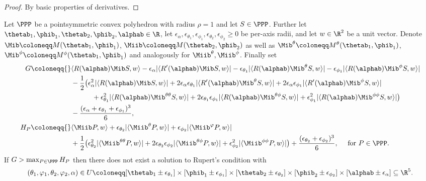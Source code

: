 \begin{proof}\leanok
By basic properties of derivatives.
\end{proof}

\begin{theorem} \label{thm:global}
\leanok
    Let $\PPP$ be a pointsymmetric convex polyhedron with radius $\rho =1$ and let $S \in \PPP$. Further let $\thetab_1,\phib_1,\thetab_2,\phib_2,\alphab \in \R$, let
    $\epsilon_\alpha, \epsilon_{\theta_1}, \epsilon_{\phi_1}, \epsilon_{\theta_2}, \epsilon_{\phi_2} \geq 0$
    be per-axis radii, and let $w\in\R^2$ be a unit vector. Denote $\Mib \coloneqq M(\thetab_1, \phib_1)$, $ \Miib \coloneqq M(\thetab_2, \phib_2)$ as well as $\Mib^{\theta} \coloneqq M^\theta(\thetab_1, \phib_1)$, $\Mib^{\phi} \coloneqq M^\phi(\thetab_1, \phib_1)$ and analogously for $\Miib^{\theta}, \Miib^{\phi}$. Finally set
    \begin{align*}
        G \coloneqq{}& \langle R(\alphab) \Mib S,w \rangle - \epsilon_\alpha|\langle R'(\alphab)  \Mib S,w \rangle| - \epsilon_{\theta_1}|\langle R(\alphab) \Mib^\theta S,w \rangle| - \epsilon_{\phi_1}|\langle R(\alphab) \Mib^\phi S,w \rangle|\\
        &- \frac{1}{2}\big(\epsilon_\alpha^2|\langle R(\alphab) \Mib S,w \rangle|
          + 2\epsilon_\alpha\epsilon_{\theta_1}|\langle R'(\alphab) \Mib^\theta S,w \rangle| + 2\epsilon_\alpha\epsilon_{\phi_1}|\langle R'(\alphab) \Mib^\phi S,w \rangle|\\
        &\qquad\quad + \epsilon_{\theta_1}^2|\langle R(\alphab) \Mib^{\theta\theta} S,w \rangle| + 2\epsilon_{\theta_1}\epsilon_{\phi_1}|\langle R(\alphab) \Mib^{\theta\phi} S,w \rangle| + \epsilon_{\phi_1}^2|\langle R(\alphab) \Mib^{\phi\phi} S,w \rangle|\big)\\
        &- \frac{(\epsilon_\alpha+\epsilon_{\theta_1}+\epsilon_{\phi_1})^3}{6},\\
        H_P \coloneqq{}& \langle \Miib P,w \rangle + \epsilon_{\theta_2}|\langle \Miib^\theta P,w \rangle|+\epsilon_{\phi_2}|\langle  \Miib^\varphi P,w \rangle|\\
        &+ \frac{1}{2}\big(\epsilon_{\theta_2}^2|\langle \Miib^{\theta\theta} P,w \rangle| + 2\epsilon_{\theta_2}\epsilon_{\phi_2}|\langle \Miib^{\theta\phi} P,w \rangle| + \epsilon_{\phi_2}^2|\langle \Miib^{\phi\phi} P,w \rangle|\big) + \frac{(\epsilon_{\theta_2}+\epsilon_{\phi_2})^3}{6}, \quad \text{ for } P \in \PPP.
    \end{align*}
    If $G>\max_{P\in \PPP} H_P$ then there does not exist a solution to Rupert's condition with
    $$(\theta_1,\varphi_1,\theta_2,\varphi_2,\alpha) \in U \coloneqq [\thetab_1\pm\epsilon_{\theta_1}]\times[\phib_1\pm\epsilon_{\phi_1}]\times[\thetab_2\pm\epsilon_{\theta_2}]\times[\phib_2\pm\epsilon_{\phi_2}]\times[\alphab\pm\epsilon_\alpha] \subseteq \R^5.$$


\end{theorem}

